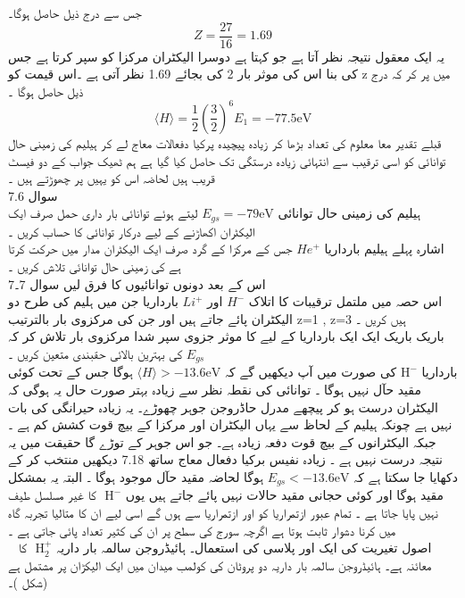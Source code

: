 جس سے درج ذیل حاصل ہوگا۔
\[Z=\frac{27}{16}=1.69\]
یہ ایک معقول نتیجہ نظر آتا ہے جو کہتا ہے دوسرا الیکٹران مرکزا کو سپر کرتا ہے جس کی بنا اس کی موثر بار 2 کی بجائے 1.69 نظر آتی ہے ۔اس قیمت کو z میں پر کر کہ درج ذیل حاصل ہوگا ۔\\
\[\langle H \rangle =\frac{1}{2}(\frac{3}{2})^{6}E_{1}=-77.5\text{eV}\]
قبلے تقدیر معا معلوم کی تعداد بڑھا کر زیادہ پیچیدہ پرکیا دفعالات معاج لے کر ہیلیم کی زمینی حال توانائی کو اسی ترقیب سے انتہائی زیادہ درستگی تک حاصل کیا گیا ہے ہم ٹھیک جواب کے دو فیسٹ قریب ہیں لحاضہ اس کو یہیں پر چھوڑتے ہیں ۔\\
سوال  
7.6\\
ہیلیم کی زمینی حال توانائی 
\(E_{gs}=-79\text{eV}\)
 لیتے ہوئے توانائی بار داری حمل صرف ایک الیکٹران اکھاڑنے کے لیے درکار توانائی کا حساب کریں ۔\\
اشارہ پہلے ہیلیم بارداریا
 \(He^{+}\)
 جس کے مرکزا کے گرد صرف ایک الیکٹران مدار میں حرکت کرتا ہے کی زمینی حال توانائی تلاش کریں ۔\\
اس کے بعد دونوں توانائیوں کا فرق لیں 
سوال 7۔7
\\
اس حصہ میں ملتمل ترقیبات کا اتلاک
 \(H^{-}\)
 اور
  \(Li^{+}\)
  بارداریا جن میں ہلیم کی طرح دو الیکٹران پائے جاتے ہیں اور جن کی مرکزوی بار بالترتیب z=1 , z=3 ہیں کریں ۔\\
باریک باریک ایک ایک بارداریا کے لیے کا موثر جزوی سپر شدا مرکزوی بار تلاش کر کہ 
\(E_{gs}\)
 کی بہترین بالائی حقبندی متعین کریں ۔\\
 بارداریا
 \(\text{H}^{-}\)
  کی صورت میں آپ دیکھیں گے کہ 
  \(\langle  H \rangle  > -13.6\text{eV}\) 
  ہوگا جس کے تحت کوئی مقید حآل نہیں ہوگا ۔
توانائی کی نقطہ نظر سے زیادہ بہتر صورت حال یہ ہوگی کہ الیکٹران درست ہو کر پیچھے مدرل حاڈروجن جوہر چھوڑے۔ یہ زیادہ حیرانگی کی بات نہیں ہے چونکہ ہیلیم کے لحاظ سے یہاں الیکٹران اور مرکزا کے بیچ قوت کشش کم ہے ۔ جبکہ الیکٹرانوں کے بیچ قوت دفعہ زیادہ ہے۔
جو اس جوہر کے توڑے گا حقیقت میں یہ نتیجہ درست نہیں ہے ۔ زیادہ نفیس برکیا دفعال معاج ساتھ 
7.18
دیکھیں 
منتخب کر کے دکھایا جا سکتا ہے کہ 
\(E_{gs}<-13.6\text{eV}\)
ہوگا لحاضہ مقید حآل موجود ہوگا ۔
البتہ یہ بمشکل مقید ہوگا اور کوئی حجانی مقید حالات نہیں پائے جاتے ہیں یوں
\(\text{ H}^{-}\)
 کا غیر مسلسل طیف نہیں پایا جاتا ہے ۔
تمام عبور ازتمراریا کو اور ازتمراریا سے ہوں گے اسی لیے ان کا متالیا تجربہ گاہ میں کرنا دشوار ثابت ہوتا ہے اگرچہ سورج کی سطح پر ان کی کثیر تعداد پائی جاتی ہے ۔\\
\
اصول تغیریت کی ایک اور پلاسی کی استعمال۔ ہائیڈروجن سالمہ بار داریہ
\(\text{ H}_{2}^{+}\)
 کا معائنہ ہے۔ ہائیڈروجن سالمہ بار داریہ دو پروٹان کی کولمب  میدان میں ایک الیکڑان پر مشتمل ہے  (شکل  )۔ 
